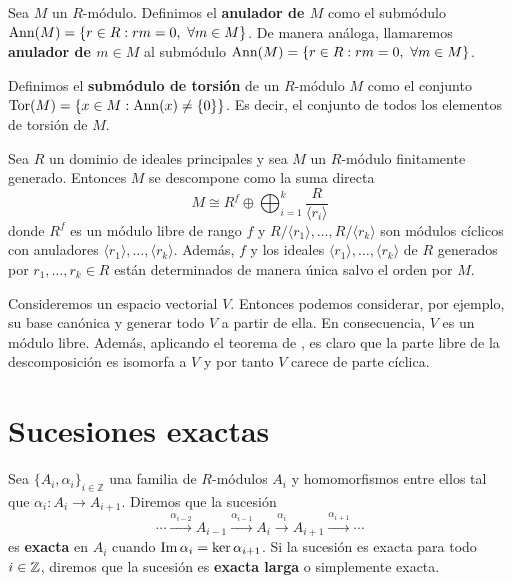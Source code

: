 \begin{definicion}
	Sea \(M\) un \(R\)-módulo. Definimos el \textbf{anulador de \(M\)} como el submódulo
	\(\ann(M) = \{r \in R : rm=0, \ \forall m \in M\}\). De manera análoga, llamaremos
	\textbf{anulador de \(m \in M\)} al submódulo
	\(\ann(M) = \{r \in R : rm=0, \ \forall m \in M\}\).
\end{definicion}

\begin{definicion}
	Definimos el \textbf{submódulo de torsión} de un \(R\)-módulo \(M\) como el
	conjunto \(\operatorname{Tor}(M)= \{x \in M : \operatorname{Ann}(x) \neq \{0\}\}\). Es decir, el conjunto de
	todos los elementos de torsión de \(M\).
\end{definicion}
\begin{teorema}
	 \label{teo:desc-cicl-prim} Sea \(R\) un dominio de ideales principales y sea
	\(M\) un \(R\)-módulo finitamente generado. Entonces \(M\) se descompone como la
	suma directa
	\[
	M \cong R^{f}\oplus \bigoplus_{i = 1}^{k}\frac{R}{\langle r_{i}\rangle}
	\]
	donde \(R^{f}\) es un módulo libre de rango \(f\) y
	\(R/\langle r_{1}\rangle, \ldots, R/\langle r_{k}\rangle\) son módulos cíclicos
	con anuladores \(\langle r_{1}\rangle, \ldots, \langle r_{k}\rangle\). Además,
	\(f\) y los ideales \(\langle r_{1}\rangle, \ldots, \langle r_{k}\rangle\) de \(R\)
	generados por \(r_{1}, \ldots, r_{k}\in R\) están determinados de manera única
	salvo el orden por \(M\).
\end{teorema}
\begin{ejemplo}
	Consideremos un espacio vectorial $V$. Entonces podemos considerar, por ejemplo, su base canónica y generar todo $V$ a partir de ella. En consecuencia, $V$ es un módulo libre. Además, aplicando el teorema de , es claro que la parte libre de la descomposición es isomorfa a $V$ y por tanto $V$ carece de parte cíclica.
\end{ejemplo}

\section{Sucesiones exactas}

\begin{definicion}
	Sea \(\{A_{i}, \alpha_{i}\}_{i \in \mathbb{Z}}\) una familia de \(R\)-módulos \(A_{i}\)
	y homomorfismos entre ellos tal que \(\alpha_{i}: A_{i}\rightarrow A_{i+1}\).
	Diremos que la sucesión
	\[
	\cdots \xrightarrow{\alpha_{i-2}}A_{i-1}\xrightarrow{\alpha_{i-1}}A_{i}\xrightarrow
	{\alpha_{i}}A_{i+1}\xrightarrow{\alpha_{i+1}}\cdots
	\]
	es \textbf{exacta} en \(A_{i}\) cuando \(\operatorname{Im} \alpha_{i}= \ker \alpha_{i+1}\). Si la sucesión es exacta para todo $i \in \mathbb{Z}$, diremos que la sucesión es \textbf{exacta larga} o simplemente exacta.
\end{definicion}

